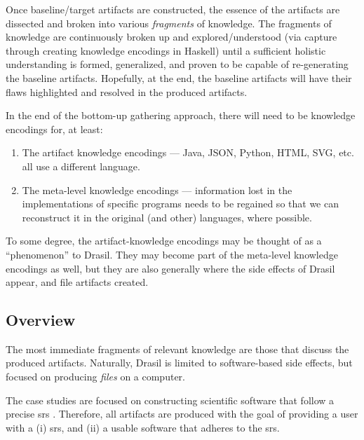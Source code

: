 Once baseline/target artifacts are constructed, the essence of the artifacts are
dissected and broken into various \textit{fragments} of knowledge. The fragments
of knowledge are continuously broken up and explored/understood (via capture
through creating knowledge encodings in Haskell) until a sufficient holistic
understanding is formed, generalized, and proven to be capable of re-generating
the baseline artifacts. Hopefully, at the end, the baseline artifacts will have
their flaws highlighted and resolved in the produced artifacts.

In the end of the bottom-up gathering approach, there will need to be knowledge
encodings for, at least:

\begin{enumerate}

      \item The artifact knowledge encodings — Java, JSON, Python, HTML, SVG,
            etc. all use a different language.

      \item The meta-level knowledge encodings — information lost in the
            implementations of specific programs needs to be regained so that we
            can reconstruct it in the original (and other) languages, where
            possible.

\end{enumerate}

To some degree, the artifact-knowledge encodings may be thought of as a
``phenomenon'' to Drasil. They may become part of the meta-level knowledge
encodings as well, but they are also generally where the side effects of Drasil
appear, and file artifacts created.

\subsection{Overview}

The most immediate fragments of relevant knowledge are those that discuss the
produced artifacts. Naturally, Drasil is limited to software-based side effects,
but focused on producing \textit{files} on a computer.

The case studies are focused on constructing scientific software that follow a
precise \acs{srs} \cite{SmithAndLai2005}. Therefore,
all artifacts are produced with the goal of providing a user with a (i)
\acl{srs}, and (ii) a usable software that adheres to the \acl{srs}.


